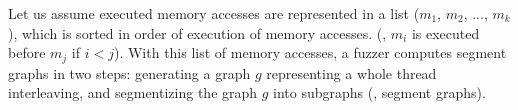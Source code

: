 %


%



%
Let us assume executed memory accesses are represented in a list
($m_1$, $m_2$, ..., $m_k$), which is sorted in order of execution of
memory accesses. (\ie, $m_i$ is executed before $m_j$ if $i<j$).
%
With this list of memory accesses, a fuzzer computes segment graphs in
two steps: generating a graph $g$ representing a whole thread
interleaving, and segmentizing the graph $g$ into subgraphs (\ie,
segment graphs).

